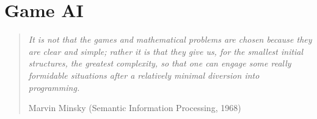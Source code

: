 \chapter{Game AI}
\chaptertoc

\begin{quotation}\textit{It is not that the games and mathematical problems are chosen because they are clear and simple; rather it is that they give us, for the smallest initial structures, the greatest complexity, so that one can engage some really formidable situations after a relatively minimal diversion into programming.} 
\begin{flushright}Marvin Minsky (Semantic Information Processing, 1968)\end{flushright}\end{quotation}




